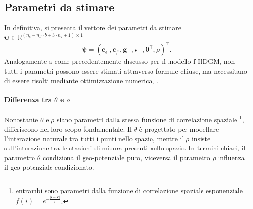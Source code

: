 \subsection[Parametri da stimare]{Parametri da stimare}
In definitiva, si presenta il vettore dei parametri da stimare $\boldsymbol{\psi}\in\mathbb{R}^{(n_\epsilon + n_\beta\cdot b + 3\cdot n_z+1)\times 1}$:
\begin{equation}
	\boldsymbol{\psi} = (\mathbf{c}_\epsilon^\top, \mathbf{c}_\beta^\top, \mathbf{g}^\top, \mathbf{v}^\top, \boldsymbol{\theta}^\top, \rho)^\top.
\end{equation}
Analogamente a come precedentemente discusso per il modello f-HDGM, non tutti i parametri possono essere stimati attraverso formule chiuse, ma necessitano di essere risolti mediante ottimizzazione numerica, .


\paragraph[Differenza tra $\theta$ e $\rho$]{Differenza tra $\theta$ e $\rho$} Nonostante $\theta$ e $\rho$ siano parametri dalla stessa funzione di correlazione spaziale \footnote{entrambi sono parametri dalla funzione di correlazione spaziale esponenziale $f(i)=e^{-\frac{\lvert\mathbf{s} - \mathbf{s}'\lvert}{i}}$.}, differiscono nel loro scopo fondamentale. Il $\theta$ è progettato per modellare l'interazione naturale tra tutti i punti nello spazio, mentre il $\rho$ insiste sull'interazione tra le stazioni di misura presenti nello spazio. 
In termini chiari, il parametro $\theta$ condiziona il geo-potenziale puro, viceversa il parametro $\rho$ influenza il geo-potenziale condizionato.
